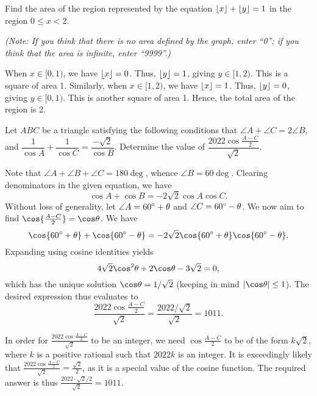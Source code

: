 \begin{question}[2]\label{Q::2023-O-1-10}
    Find the area of the region represented by the equation $\left\lfloor x \right\rfloor + \left\lfloor y \right\rfloor = 1$ in the region $0 \leq x < 2$.

    \noindent\textit{(Note: If you think that there is no area defined by the graph, enter ``0''; if you think that the area is infinite, enter ``9999''.)}
\end{question}
\begin{solution*}
    When $x \in [0, 1)$, we have $\left\lfloor x \right\rfloor = 0$. Thus, $\left\lfloor y \right\rfloor = 1$, giving $y \in [1, 2)$. This is a square of area 1. Similarly, when $x \in [1, 2)$, we have $\left\lfloor x \right\rfloor = 1$. Thus, $\left\lfloor y \right\rfloor = 0$, giving $y \in [0, 1)$. This is another square of area 1. Hence, the total area of the region is 2.
\end{solution*}

\begin{question}[1011]\label{Q::2023-O-1-11}
    Let $ABC$ be a triangle satisfying the following conditions that $\angle A + \angle C = 2\angle B$, and $\dfrac1{\cos A} + \dfrac1{\cos C} = \dfrac{-\sqrt2}{\cos B}$. Determine the value of $\dfrac{2022\cos{\frac{A-C}{2}}}{\sqrt2}$.
\end{question}
\begin{solution}
    Note that $\angle A + \angle B + \angle C = 180 \deg$, whence $\angle B = 60 \deg$. Clearing denominators in the given equation, we have \[\cos A + \cos B = -2\sqrt{2}\cos A \cos C. \] Without loss of generality, let $\angle A = 60^{\circ} + \theta$ and $\angle C = 60 ^{\circ} - \theta$. We now aim to find $\cos{\frac{A-C}{2}} = \cos\t$. We have \[\cos{60\deg + \t} + \cos{60\deg - \t} = -2\sqrt2 \cos{60\deg + \t}\cos{60 \deg - \t}.\] Expanding using cosine identities yields \[4\sqrt2 \cos^2 \t + 2\cos \t - 3\sqrt2 = 0,\] which has the unique solution $\cos \t = 1/\sqrt2$ (keeping in mind $\abs{\cos \t} \leq 1$). The desired expression thus evaluates to \[\frac{2022\cos{\tfrac{A-C}{2}}}{\sqrt2} = \frac{2022/\sqrt{2}}{\sqrt2} = 1011.\]
\end{solution}
\begin{solution}
    In order for $\frac{2022\cos{\frac{A-C}{2}}}{\sqrt2}$ to be an integer, we need $\cos{\frac{A-C}{2}}$ to be of the form $k\sqrt{2}$, where $k$ is a positive rational such that $2022k$ is an integer. It is exceedingly likely that $\frac{2022\cos{\frac{A-C}{2}}}{\sqrt2} = \frac{\sqrt2}{2}$, as it is a special value of the cosine function. The required answer is thus $\frac{2022\cdot\sqrt{2}/2}{\sqrt2} = 1011$.
\end{solution}

